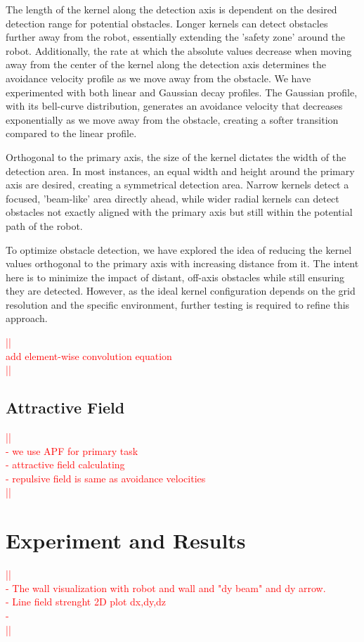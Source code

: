 \documentclass[a4paper]{article}
\newcommand\todocomment[1]{\textcolor{red}{||\\ #1\\||}}
\begin{document}
The length of the kernel along the detection axis is dependent on the desired detection range for potential obstacles. Longer kernels can detect obstacles further away from the robot, essentially extending the 'safety zone' around the robot. Additionally, the rate at which the absolute values decrease when moving away from the center of the kernel along the detection axis determines the avoidance velocity profile as we move away from the obstacle. We have experimented with both linear and Gaussian decay profiles. The Gaussian profile, with its bell-curve distribution, generates an avoidance velocity that decreases exponentially as we move away from the obstacle, creating a softer transition compared to the linear profile.

Orthogonal to the primary axis, the size of the kernel dictates the width of the detection area. In most instances, an equal width and height around the primary axis are desired, creating a symmetrical detection area. Narrow kernels detect a focused, 'beam-like' area directly ahead, while wider radial kernels can detect obstacles not exactly aligned with the primary axis but still within the potential path of the robot.

To optimize obstacle detection, we have explored the idea of reducing the kernel values orthogonal to the primary axis with increasing distance from it. The intent here is to minimize the impact of distant, off-axis obstacles while still ensuring they are detected. However, as the ideal kernel configuration depends on the grid resolution and the specific environment, further testing is required to refine this approach.

\todocomment{add element-wise convolution equation}

		 
\subsection{Attractive Field}

\todocomment{- we use APF for primary task\\
			 - attractive field calculating \\
		 	 - repulsive field is same as avoidance velocities}



\section{Experiment and Results}

\todocomment{- The wall visualization with robot and wall and "dy beam" and dy arrow. \\
			 - Line field strenght 2D plot dx,dy,dz \\
		 	 - }
\end{document}
